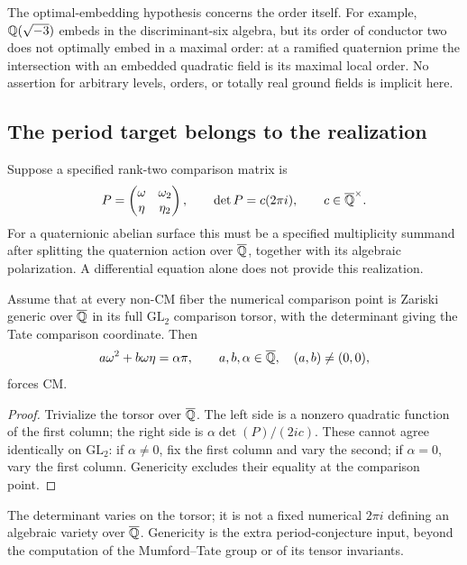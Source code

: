 The optimal-embedding hypothesis concerns the order itself. For example,
$\mathbb Q(\sqrt{-3})$ embeds in the discriminant-six algebra, but its order
of conductor two does not optimally embed in a maximal order: at a
ramified quaternion prime the intersection with an embedded quadratic
field is its maximal local order. No assertion for arbitrary levels,
orders, or totally real ground fields is implicit here.

\subsection{The period target belongs to the realization}
\label{subsec:compact-period-target}
Suppose a specified rank-two comparison matrix is
\[
 P=\begin{pmatrix}\omega&\omega_2\\\eta&\eta_2\end{pmatrix},
 \qquad \det P=c(2\pi i),\qquad c\in\overline{\mathbb Q}^\times.
\]
For a quaternionic abelian surface this must be a specified multiplicity
summand after splitting the quaternion action over $\overline{\mathbb Q}$, together
with its algebraic polarization. A differential equation alone does
not provide this realization.

\begin{proposition}
\label{prop:rank-two-torsor-cm}
Assume that at every non-CM fiber the numerical comparison point is
Zariski generic over $\overline{\mathbb Q}$ in its full $\mathrm{GL}_2$ comparison
torsor, with the determinant giving the Tate comparison coordinate.
Then
\[
 a\omega^2+b\omega\eta=\alpha\pi,
 \qquad a,b,\alpha\in\overline{\mathbb Q},\quad(a,b)\ne(0,0),
\]
forces CM.
\end{proposition}
\begin{proof}
Trivialize the torsor over $\overline{\mathbb Q}$. The left side is a nonzero quadratic
function of the first column; the right side is
$\alpha\det(P)/(2ic)$. These cannot agree identically on
$\mathrm{GL}_2$: if $\alpha\ne0$, fix the first column and vary the
second; if $\alpha=0$, vary the first column. Genericity excludes
their equality at the comparison point.
\end{proof}
The determinant varies on the torsor; it is not a fixed numerical
$2\pi i$ defining an algebraic variety over $\overline{\mathbb Q}$. Genericity is
the extra period-conjecture input, beyond the computation of the
Mumford--Tate group or of its tensor invariants.

